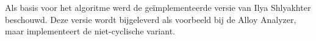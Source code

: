 \documentclass[10pt,a4paper]{article}
\begin{document}
		\noindent Als basis voor het algoritme werd de ge\"implementeerde versie van Ilya Shlyakhter beschouwd. Deze versie wordt bijgeleverd als voorbeeld bij de Alloy Analyzer, maar implementeert de niet-cyclische variant.

		
\end{document}
